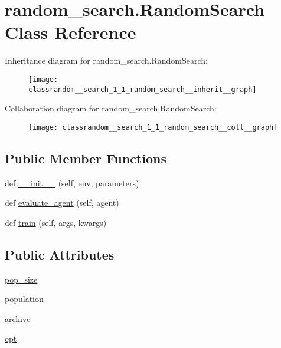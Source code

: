 \hypertarget{classrandom__search_1_1_random_search}{}\section{random\+\_\+search.\+Random\+Search Class Reference}
\label{classrandom__search_1_1_random_search}


Inheritance diagram for random\+\_\+search.\+Random\+Search\+:
\nopagebreak
\begin{figure}[H]
\begin{center}
\leavevmode
\texttt{[image: classrandom\_\_search\_1\_1\_random\_search\_\_inherit\_\_graph]}
\end{center}
\end{figure}


Collaboration diagram for random\+\_\+search.\+Random\+Search\+:
\nopagebreak
\begin{figure}[H]
\begin{center}
\leavevmode
\texttt{[image: classrandom\_\_search\_1\_1\_random\_search\_\_coll\_\_graph]}
\end{center}
\end{figure}
\subsection*{Public Member Functions}
\begin{DoxyCompactItemize}
\item 
def \hyperlink{classrandom__search_1_1_random_search_a56c3097ae0162a6133bb209b151e850c}{\+\_\+\+\_\+init\+\_\+\+\_\+} (self, env, parameters)
\item 
def \hyperlink{classrandom__search_1_1_random_search_ae41f2cbc79a230b618d5e5d285c6ff03}{evaluate\+\_\+agent} (self, agent)
\item 
def \hyperlink{classrandom__search_1_1_random_search_a0de614be8a822b25236b05b0168eea0d}{train} (self, args, kwargs)
\end{DoxyCompactItemize}
\subsection*{Public Attributes}
\begin{DoxyCompactItemize}
\item 
\hyperlink{classrandom__search_1_1_random_search_aec15904852f536501f145ef3ae617ef6}{pop\+\_\+size}
\item 
\hyperlink{classrandom__search_1_1_random_search_a6b6f7c82b0264087fc807cc77566fdcb}{population}
\item 
\hyperlink{classrandom__search_1_1_random_search_aceb9434d695a356fc918b746b34ec40c}{archive}
\item 
\hyperlink{classrandom__search_1_1_random_search_a1c853c735f1ffdfed2377b535c86dfb8}{opt}
\end{DoxyCompactItemize}


